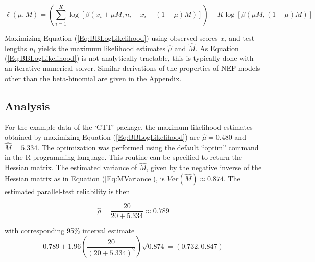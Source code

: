 \documentclass[12pt,epsfig]{article}
\begin{document}
\begin{equation}
    \ell(\mu, M) = \left(\displaystyle \sum_{i = 1}^K \log[\beta(x_i + \mu M, n_i - x_i + (1 - \mu)M)]\right) - K\log[\beta(\mu M, (1 - \mu)M)]
    \label{Eq:BBLogLikelihood}
\end{equation}

\noindent Maximizing Equation (\ref{Eq:BBLogLikelihood}) using observed scores $x_i$ and test lengths $n_i$ yields the maximum likelihood estimates $\hat{\mu}$ and $\hat{M}$. As Equation (\ref{Eq:BBLogLikelihood}) is not analytically tractable, this is typically done with an iterative numerical solver. Similar derivations of the properties of NEF models other than the beta-binomial are given in the Appendix.





\subsection{Analysis}
\label{Subsec:RealExample}

For the example data of the `CTT' package, the maximum likelihood estimates obtained by maximizing Equation (\ref{Eq:BBLogLikelihood}) are $\hat{\mu} = 0.480$ and $\hat{M} = 5.334$.  The optimization was performed using the default ``optim'' command in the R programming language. This routine can be specified to return the Hessian matrix. The estimated variance of $\hat{M}$, given by the negative inverse of the Hessian matrix as in Equation (\ref{Eq:MVariance}), is $Var(\hat{M}) \approx 0.874$. The estimated parallel-test reliability is then

\begin{equation*}
    \hat{\rho} = \dfrac{20}{20 + 5.334} \approx 0.789
\end{equation*}

\noindent with corresponding 95\% interval estimate
\begin{equation*}
    0.789 \pm 1.96 \left(\dfrac{20}{(20+5.334)^2}\right) \sqrt{0.874} = (0.732, 0.847)
\end{equation*}
\end{document}

